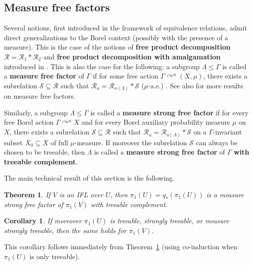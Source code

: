 \documentclass[11pt]{amsart}
\theoremstyle{definition}
\theoremstyle{plain}
\newtheorem{theorem}[definition]{Theorem}
\newtheorem{corollary}[definition]{Corollary}
\newcommand{\<}{\langle}
\renewcommand{\>}{\rangle}
\newcommand{\actson}{\curvearrowright}
\newcommand{\subrel}{\subseteq}
\newcommand{\define}[1]{\textbf{#1}}
\newcommand{\pmp}{\text{p.m.p.}}
\newcommand\RR{\mathscr{R}}
\begin{document}
\subsection{\texorpdfstring{Measure free factors}{Measure free factors of Fn}}
\label{sect:Meas free fact}

Several notions, first introduced in the framework of \pmp{} equivalence relations, admit direct generalizations to the Borel context (possibly with the presence of a measure).
This is the case of the notions of \define{free product decomposition} $\RR=\RR_1*\RR_2$ and \define{free product decomposition with amalgamation} introduced in \cite[D\'ef. IV.9, D\'ef. IV.6]{Gab00a}.
This is also the case for the following: a subgroup $\Lambda\leq \Gamma$ is called a \define{measure free factor} of $\Gamma$ if for some
\pmp{} free action $\Gamma\actson^{a} (X,\mu)$, there exists a subrelation $\mathcal{S}\subrel \RR$ such that  $\RR_a=\RR_{a (\Lambda)} * \mathcal{S}$ ($\mu$-a.e.) \cite[Def. 3.1]{Ga05}. See also \cite{Alonso-2014} for more results on measure free factors.


Similarly, a subgroup $\Lambda\leq \Gamma$ is called a \define{measure strong free factor}
 if for every free Borel action $\Gamma\actson^{a} X$ and for every Borel auxiliary probability measure $\mu$ on $X$,  there exists a subrelation $\mathcal{S}\subrel \RR$ such that
$\RR_a=\RR_{a (\Lambda)} * \mathcal{S}$ on a $\Gamma$-invariant subset $X_0\subseteq X$ of full $\mu$-measure.
If moreover the subrelation $ \mathcal{S}$ can always be chosen to be treeable, then
$\Lambda$ is called a \define{measure strong free factor} of $\Gamma$ \define{with treeable complement}.


The main technical result of this section is the following.
\begin{theorem}\label{th: pi1 V meas str. treeable over U}
If $V$ is an IFL  over $U$, then
$\pi_1(U)=q_*(\pi_1(U))$ is a measure strong free factor of  $\pi_1(V)$ with treeable complement.
\end{theorem}

\begin{corollary}\label{cor: pi1 U some-treeab implies same for pi1 V}
If moreover $\pi_1(U)$ is treeable, strongly treeable, or measure strongly treeable, then the same holds for $\pi_1(V)$.
\end{corollary}
This  corollary follows immediately from Theorem~\ref{th: pi1 V meas str. treeable over U} (using co-induction when $\pi_1(U)$ is only treeable).
%
\end{document}
